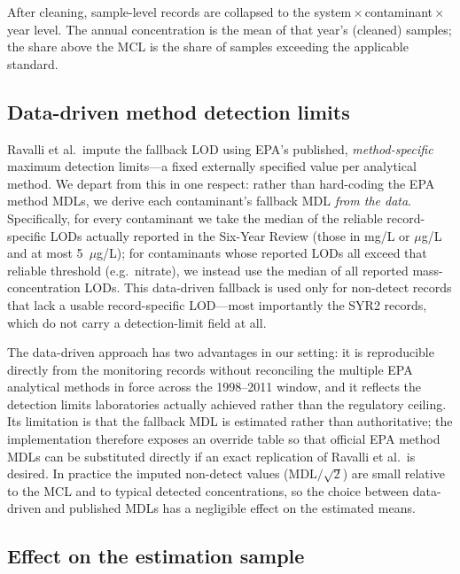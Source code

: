 After cleaning, sample-level records are collapsed to the
system\,$\times$\,contaminant\,$\times$\,year level. The annual concentration is
the mean of that year's (cleaned) samples; the share above the MCL is the share
of samples exceeding the applicable standard.

\subsection{Data-driven method detection limits}
\label{subsec:mdl}

Ravalli et al.\ impute the fallback LOD using EPA's published,
\emph{method-specific} maximum detection limits---a fixed externally specified
value per analytical method. We depart from this in one respect: rather than
hard-coding the EPA method MDLs, we derive each contaminant's fallback MDL
\emph{from the data}. Specifically, for every contaminant we take the median of
the reliable record-specific LODs actually reported in the Six-Year Review
(those in mg/L or $\mu$g/L and at most 5~$\mu$g/L); for contaminants whose
reported LODs all exceed that reliable threshold (e.g.\ nitrate), we instead use
the median of all reported mass-concentration LODs. This data-driven fallback is
used only for non-detect records that lack a usable record-specific LOD---most
importantly the SYR2 records, which do not carry a detection-limit field at all.

The data-driven approach has two advantages in our setting: it is reproducible
directly from the monitoring records without reconciling the multiple EPA
analytical methods in force across the 1998--2011 window, and it reflects the
detection limits laboratories actually achieved rather than the regulatory
ceiling. Its limitation is that the fallback MDL is estimated rather than
authoritative; the implementation therefore exposes an override table so that
official EPA method MDLs can be substituted directly if an exact replication of
Ravalli et al.\ is desired. In practice the imputed non-detect values
($\mathrm{MDL}/\sqrt 2$) are small relative to the MCL and to typical detected
concentrations, so the choice between data-driven and published MDLs has a
negligible effect on the estimated means.%

\subsection{Effect on the estimation sample}

